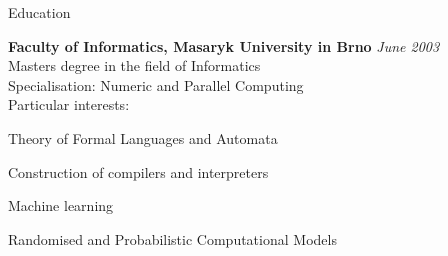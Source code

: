 \documentclass{resume} %
\begin{document}

\begin{rSection}{Education}

{\bf Faculty of Informatics, Masaryk University in Brno} \hfill {\em June 2003} \\ 
Masters degree in the field of Informatics \\
Specialisation: Numeric and Parallel Computing \\
Particular interests:
\item Theory of Formal Languages and Automata
\item Construction of compilers and interpreters
\item Machine learning
\item Randomised and Probabilistic Computational Models

\end{rSection}

\end{document}
